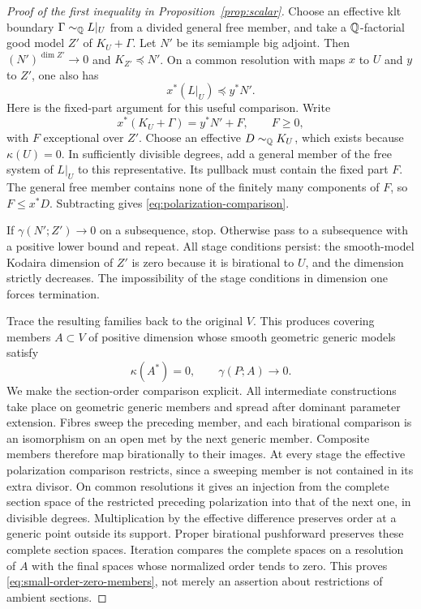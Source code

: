 \begin{proof}[Proof of the first inequality in Proposition~\ref{prop:scalar}]
Choose an effective klt boundary $\Gamma\sim_{\mathbb Q}L|_U$ from
a divided general free member, and take a $\mathbb Q$-factorial good
model $Z'$ of $K_U+\Gamma$.  Let $N'$ be its semiample big
adjoint.  Then $(N')^{\dim Z'}\to0$ and
$K_{Z'}\preceq N'$.  On a common resolution with maps
$x$ to $U$ and $y$ to $Z'$, one also has
\begin{equation}\label{eq:polarization-comparison}
                             x^*(L|_U)\preceq y^*N'.
\end{equation}
Here is the fixed-part argument for this useful comparison.
Write
\[
                    x^*(K_U+\Gamma)=y^*N'+F,
                    \qquad F\ge0,
\]
with $F$ exceptional over $Z'$.  Choose an effective
$D\sim_{\mathbb Q}K_U$, which exists because $\kappa(U)=0$.
In sufficiently divisible degrees, add a general member of the
free system of $L|_U$ to this representative.  Its pullback must
contain the fixed part $F$.  The general free member contains
none of the finitely many components of $F$, so
$F\le x^*D$.  Subtracting gives
\eqref{eq:polarization-comparison}.

If $\gamma(N';Z')\to0$ on a subsequence, stop.  Otherwise pass
to a subsequence with a positive lower bound and repeat.  All
stage conditions persist: the smooth-model Kodaira dimension of
$Z'$ is zero because it is birational to $U$, and the dimension
strictly decreases.  The impossibility of the stage conditions
in dimension one forces termination.

Trace the resulting families back to the original $V$.  This
produces covering members $A\subset V$ of positive dimension
whose smooth geometric generic models satisfy
\begin{equation}\label{eq:small-order-zero-members}
                        \kappa(A^*)=0,
                        \qquad\gamma(P;A)\longrightarrow0.
\end{equation}
We make the section-order comparison explicit.  All intermediate
constructions take place on geometric generic members and spread
after dominant parameter extension.  Fibres sweep the preceding
member, and each birational comparison is an isomorphism on an
open met by the next generic member.  Composite members therefore
map birationally to their images.  At every stage the effective
polarization comparison restricts, since a sweeping member is
not contained in its extra divisor.  On common resolutions it
gives an injection from the complete section space of the
restricted preceding polarization into that of the next one,
in divisible degrees.  Multiplication by the effective
difference preserves order at a generic point outside its
support.  Proper birational pushforward preserves these complete
section spaces.  Iteration compares the complete spaces on a
resolution of $A$ with the final spaces whose normalized order
tends to zero.  This proves \eqref{eq:small-order-zero-members},
not merely an assertion about restrictions of ambient sections.


\end{proof}
